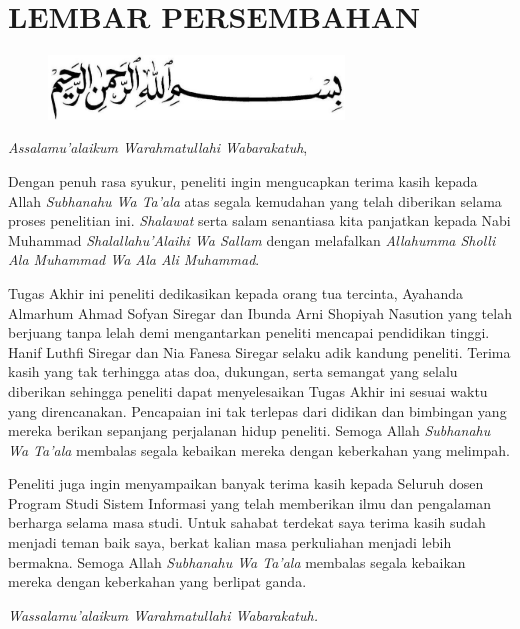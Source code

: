 %
%
%
%

\chapter*{LEMBAR PERSEMBAHAN}

\begin{figure}
	\centering
	\includegraphics[width=0.7\textwidth]{konten/gambar/bismillah.jpg}
\end{figure}

\textit{Assalamu’alaikum Warahmatullahi Wabarakatuh},

Dengan penuh rasa syukur, peneliti ingin mengucapkan terima kasih kepada Allah \textit{Subhanahu Wa Ta’ala} atas segala kemudahan yang telah diberikan selama proses penelitian ini. \textit{Shalawat} serta salam senantiasa kita panjatkan kepada Nabi Muhammad \textit{Shalallahu’Alaihi Wa Sallam} dengan melafalkan \textit{Allahumma Sholli Ala Muhammad Wa Ala Ali Muhammad}.

Tugas Akhir ini peneliti dedikasikan kepada orang tua tercinta, Ayahanda Almarhum Ahmad Sofyan Siregar dan Ibunda Arni Shopiyah Nasution yang telah berjuang tanpa lelah demi mengantarkan peneliti mencapai pendidikan tinggi. Hanif Luthfi Siregar dan Nia Fanesa Siregar selaku adik kandung peneliti. Terima kasih yang tak terhingga atas doa, dukungan, serta semangat yang selalu diberikan sehingga peneliti dapat menyelesaikan Tugas Akhir ini sesuai waktu yang direncanakan. Pencapaian ini tak terlepas dari didikan dan bimbingan yang mereka berikan sepanjang perjalanan hidup peneliti. Semoga Allah \textit{Subhanahu Wa Ta’ala} membalas segala kebaikan mereka dengan keberkahan yang melimpah.

Peneliti juga ingin menyampaikan banyak terima kasih kepada Seluruh dosen Program Studi Sistem Informasi yang telah memberikan ilmu dan pengalaman berharga selama masa studi. Untuk sahabat terdekat saya terima kasih sudah menjadi teman baik saya, berkat kalian masa perkuliahan menjadi lebih bermakna. Semoga Allah \textit{Subhanahu Wa Ta’ala} membalas segala kebaikan mereka dengan keberkahan yang berlipat ganda.

\textit{Wassalamu’alaikum Warahmatullahi Wabarakatuh.}